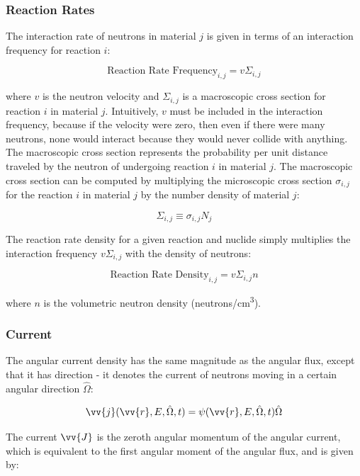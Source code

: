 \documentclass[10pt]{article}
\newcommand{\beq}{\begin{equation}}
\newcommand{\eeq}{\end{equation}}
\newcommand{\hO}{\hat{\Omega}}
\newcommand{\spa}{(\vv{r}, E, \hO, t)}
\begin{document}
\begin{flushleft}
\subsubsection{Reaction Rates}

The interaction rate of neutrons in material \(j\) is given in terms of an interaction frequency for reaction \(i\):

\begin{equation}
\label{eq:ReactionFrequency}
\textrm{Reaction Rate Frequency}_{i, j} = v\Sigma_{i, j}
\end{equation}

where \(v\) is the neutron velocity and \(\Sigma_{i, j}\) is a macroscopic cross section for reaction \(i\) in material \(j\). Intuitively, \(v\) must be included in the interaction frequency, because if the velocity were zero, then even if there were many neutrons, none would interact because they would never collide with anything. The macroscopic cross section represents the probability per unit distance traveled by the neutron of undergoing reaction \(i\) in material \(j\). The macroscopic cross section can be computed by multiplying the microscopic cross section \(\sigma_{i,j}\) for the reaction \(i\) in material \(j\) by the number density of material \(j\):

\beq
\Sigma_{i,j}\equiv\sigma_{i,j}N_j
\eeq

The reaction rate density for a given reaction and nuclide simply multiplies the interaction frequency \(v\Sigma_{i,j}\) with the density of neutrons:

\beq
\label{eq:ReactionRateDensity}
\textrm{Reaction Rate Density}_{i,j} = v\Sigma_{i,j}n
\eeq

where \(n\) is the volumetric neutron density (neutrons/cm\textsuperscript{3}). 

\subsubsection{Current}

The angular current density has the same magnitude as the angular flux, except that it has direction - it denotes the current of neutrons moving in a certain angular direction \(\hO\):

\beq
\label{eq:AngularCurrent}
\vv{j}\spa = \psi\spa\hO  
\eeq

The current \(\vv{J}\) is the zeroth angular momentum of the angular current, which is equivalent to the first angular moment of the angular flux, and is given by:




\end{flushleft}
\end{document}
